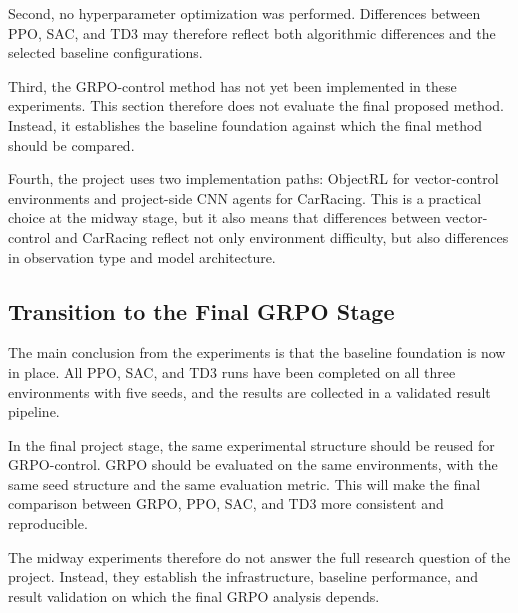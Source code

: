 Second, no hyperparameter optimization was performed. Differences between PPO, SAC, and TD3 may therefore reflect both algorithmic differences and the selected baseline configurations.

Third, the GRPO-control method has not yet been implemented in these experiments. This section therefore does not evaluate the final proposed method. Instead, it establishes the baseline foundation against which the final method should be compared.

Fourth, the project uses two implementation paths: ObjectRL for vector-control environments and project-side CNN agents for CarRacing. This is a practical choice at the midway stage, but it also means that differences between vector-control and CarRacing reflect not only environment difficulty, but also differences in observation type and model architecture.

\subsection{Transition to the Final GRPO Stage}
\label{sec:transition-final-grpo}

The main conclusion from the experiments is that the baseline foundation is now in place. All PPO, SAC, and TD3 runs have been completed on all three environments with five seeds, and the results are collected in a validated result pipeline.

In the final project stage, the same experimental structure should be reused for GRPO-control. GRPO should be evaluated on the same environments, with the same seed structure and the same evaluation metric. This will make the final comparison between GRPO, PPO, SAC, and TD3 more consistent and reproducible.

The midway experiments therefore do not answer the full research question of the project. Instead, they establish the infrastructure, baseline performance, and result validation on which the final GRPO analysis depends.
